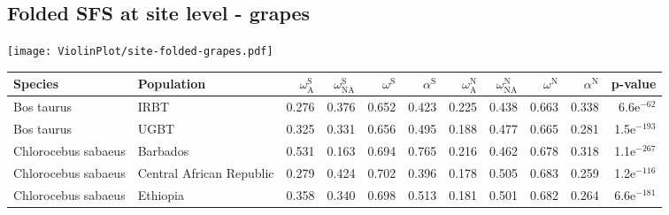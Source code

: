 \subsection{Folded SFS at site level - grapes} 
\begin{center}
\texttt{[image: ViolinPlot/site-folded-grapes.pdf]} 
\begin{adjustbox}{width = 1\textwidth}
\begin{tabular}{llrrrrrrrrr}
\toprule
             Species &                Population & $\omega_{\textrm{A}}^{\textrm{S}}$ & $\omega_{\textrm{NA}}^{\textrm{S}}$ & $\omega^{\textrm{S}}$ & $\alpha^{\textrm{S}}$ & $\omega_{\textrm{A}}^{\textrm{N}}$ & $\omega_{\textrm{NA}}^{\textrm{N}}$ & $\omega^{\textrm{N}}$ & $\alpha^{\textrm{N}}$ &       p-value \\
\midrule
          Bos taurus &                      IRBT &                              0.276 &                               0.376 &                 0.652 &                 0.423 &                              0.225 &                               0.438 &                 0.663 &                 0.338 &  6.6e$^{-62}$ \\
          Bos taurus &                      UGBT &                              0.325 &                               0.331 &                 0.656 &                 0.495 &                              0.188 &                               0.477 &                 0.665 &                 0.281 & 1.5e$^{-193}$ \\
 Chlorocebus sabaeus &                  Barbados &                              0.531 &                               0.163 &                 0.694 &                 0.765 &                              0.216 &                               0.462 &                 0.678 &                 0.318 & 1.1e$^{-267}$ \\
 Chlorocebus sabaeus &  Central African Republic &                              0.279 &                               0.424 &                 0.702 &                 0.396 &                              0.178 &                               0.505 &                 0.683 &                 0.259 & 1.2e$^{-116}$ \\
 Chlorocebus sabaeus &                  Ethiopia &                              0.358 &                               0.340 &                 0.698 &                 0.513 &                              0.181 &                               0.501 &                 0.682 &                 0.264 & 6.6e$^{-181}$ \\

\end{tabular}
\end{adjustbox}
\end{center}
